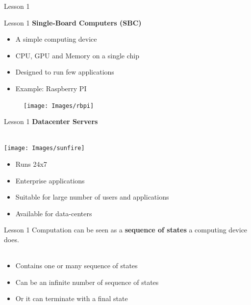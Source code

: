 \documentclass[aspectratio=1610]{beamer}
\begin{document}
\begin{frame}{Lesson 1}{}
\begin{minipage}{.0\textwidth}
\begin{figure}
      \end{figure}
  \end{minipage}  
\end{frame}



\begin{frame}{Lesson 1}{}
{\Large\textbf{{Single-Board Computers (SBC)}}}
\Large
\begin{minipage}{0.65\textwidth}
    \begin{itemize}
      \item A simple computing device 
      \item CPU, GPU and Memory on a single chip
      \item Designed to run few applications
      \item Example: Raspberry PI 
    \end{itemize}
  \end{minipage}
\begin{minipage}{.0\textwidth}
      \begin{figure}
        \texttt{[image: Images/rbpi]}
      \end{figure}
  \end{minipage}  
\end{frame}





\begin{frame}{Lesson 1}{}
{\Large\textbf{{Datacenter Servers}}}\\~\\
\begin{minipage}{0.50\textwidth}
\texttt{[image: Images/sunfire]}
\end{minipage}
\Large
\begin{minipage}{0.48\textwidth}
    \begin{itemize}
      \item Runs 24x7
      \item Enterprise applications
      \item Suitable for large number of users and applications 
      \item Available for data-centers
    \end{itemize}
  \end{minipage}
\end{frame}



\begin{frame}{Lesson 1}{}
\LARGE
Computation can be seen as a \textbf{sequence of states} a computing device does.\\~\\
\begin{itemize}
    \item Contains one or many sequence of states
    \item Can be an infinite number of sequence of states
    \item Or it can terminate with a final state
 \end{itemize}
\end{frame}
\end{document}
